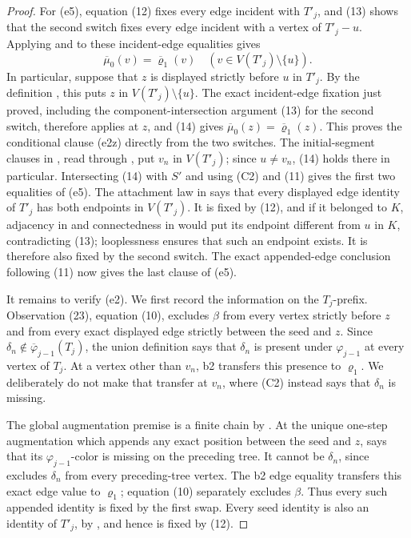 \begin{proof}
For (e5), equation (12) fixes every edge incident with \(T'_j\), and
(13) shows that the second switch fixes every edge incident with a vertex
of \(T'_j-u\).  Applying  and
 to these incident-edge equalities gives
\[
 \overline{\mu}_0(v)=\overline{\varrho}_1(v)
 \quad(v\in V(T'_j)\setminus\{u\}).                            \tag{14}
\]
In particular, suppose that \(z\) is displayed strictly before \(u\) in
\(T'_j\).  By the definition , this puts
\(z\) in \(V(T'_j)\setminus\{u\}\).  The exact incident-edge fixation just
proved, including the component-intersection argument (13) for the second
switch, therefore applies at \(z\), and (14) gives
\(\overline\mu_0(z)=\overline{\varrho}_1(z)\).  This proves the
conditional clause (e2z) directly from the two switches.
The initial-segment clauses in , read
through , put \(v_n\) in \(V(T'_j)\); since
\(u\ne v_n\), (14) holds there in particular.  Intersecting (14) with \(S'\) and
using (C2) and (11) gives the first two equalities of (e5).  The attachment
law in  says that every displayed edge identity of
\(T'_j\) has both endpoints in \(V(T'_j)\).  It is fixed by (12), and if it
belonged to \(K\), adjacency in
 and connectedness in
 would put its endpoint different from \(u\)
in \(K\), contradicting (13); looplessness ensures that such an endpoint
exists.  It is therefore also fixed by the second switch.  The exact
appended-edge conclusion following (11) now gives the last clause of (e5).

It remains to verify (e2).  We first record the information on the
\(T_j\)-prefix.  Observation (23), equation (10), excludes \(\beta\) from
every vertex strictly before \(z\) and from every exact displayed edge
strictly between the seed and \(z\).  Since
\(\delta_n\notin\overline\varphi_{j-1}(T_j)\), the union definition
 says that \(\delta_n\) is present under
\(\varphi_{j-1}\) at every vertex of \(T_j\).  At a vertex other than
\(v_n\), b2 transfers this presence to \(\varrho_1\).  We deliberately do
not make that transfer at \(v_n\), where (C2) instead says that
\(\delta_n\) is missing.

The global augmentation premise is a finite chain by
.  At the unique one-step
augmentation which appends any exact position between the seed and \(z\),
 says that its
\(\varphi_{j-1}\)-color is missing on the preceding tree.  It cannot be
\(\delta_n\), since  excludes \(\delta_n\)
from every preceding-tree vertex.  The b2 edge equality transfers this
exact edge value to \(\varrho_1\); equation (10) separately excludes
\(\beta\).  Thus every such appended identity is fixed by the first swap.
Every seed identity is also an identity of \(T'_j\), by
, and hence is fixed by (12).


\end{proof}
